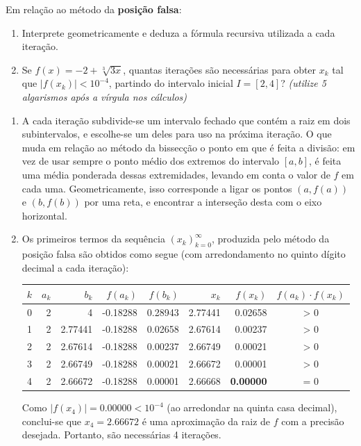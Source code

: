 \documentclass[12pt,a4paper]{article}
\begin{document}
\begin{ExerciseList}
\Exercise[title={2,5}] Em relação ao método da \textbf{posição falsa}:
\begin{enumerate}
\item Interprete geometricamente e deduza a fórmula recursiva utilizada a cada iteração.
\item Se $f(x) = -2 + \sqrt[3]{3x}$, quantas iterações são necessárias para obter $x_k$ tal que $|f(x_k)| < 10^{-4}$, partindo do intervalo inicial $I = [2, 4]$? \textit{(utilize 5 algarismos após a vírgula nos cálculos)}
\end{enumerate}
\Answer
\begin{enumerate}
\item A cada iteração subdivide-se um intervalo fechado que contém a raiz em dois subintervalos, e escolhe-se um deles para uso na próxima iteração. O que muda em relação ao método da bissecção o ponto em que é feita a divisão: em vez de usar sempre o ponto médio dos extremos do intervalo $[a,b]$, é feita uma média ponderada dessas extremidades, levando em conta o valor de $f$ em cada uma. Geometricamente, isso corresponde a ligar os pontos $(a, f(a))$ e $(b, f(b))$ por uma reta, e encontrar a interseção desta com o eixo horizontal.
\item Os primeiros termos da sequência $(x_k)_{k=0}^\infty$, produzida pelo método da posição falsa são obtidos como segue (com arredondamento no quinto dígito decimal a cada iteração):
\begin{center}
\begin{tabular}{|r|r|r|r|r|r|r|c|}
\hline
$k$ & $a_k$ & $b_k$ & $f(a_k)$ & $f(b_k)$ & $x_k$ & $f(x_k)$ & $f(a_k)\cdot f(x_k)$ \\
\hline
0 & 2 & 4 & -0.18288 & 0.28943 & 2.77441 & 0.02658 & > 0 \\
\hline
1 & 2 & 2.77441 & -0.18288 & 0.02658 & 2.67614 & 0.00237 & > 0 \\
\hline
2 & 2 & 2.67614 & -0.18288 & 0.00237 & 2.66749 & 0.00021 & > 0 \\
\hline
3 & 2 & 2.66749 & -0.18288 & 0.00021 & 2.66672 & 0.00001 & > 0 \\
\hline
4 & 2 & 2.66672 & -0.18288 & 0.00001 & 2.66668 & \textbf{0.00000} & = 0 \\
\hline
\end{tabular}
\end{center}
\medskip
Como $|f(x_4)| = 0.00000 < 10^{-4}$ (ao arredondar na quinta casa decimal), conclui-se que $x_4 = 2.66672$ é uma aproximação da raiz de $f$ com a precisão desejada. Portanto, são necessárias 4 iterações.
\end{enumerate}


\end{ExerciseList}
\end{document}
